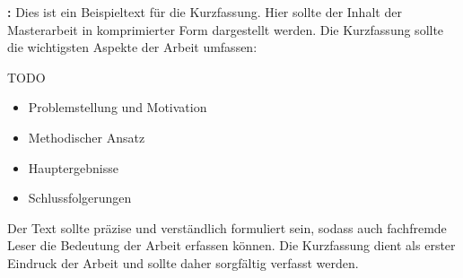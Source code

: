 

\textbf{\abstractLabel:} Dies ist ein Beispieltext für die Kurzfassung. Hier sollte der Inhalt der Masterarbeit in komprimierter
Form dargestellt werden. Die Kurzfassung sollte die wichtigsten Aspekte der Arbeit umfassen:

TODO

\begin{itemize}[leftmargin=0.63cm, label=\textbullet]
    \item Problemstellung und Motivation
    \item Methodischer Ansatz
    \item Hauptergebnisse
    \item Schlussfolgerungen
\end{itemize}

Der Text sollte präzise und verständlich formuliert sein, sodass auch fachfremde Leser die Bedeutung der
Arbeit erfassen können. Die Kurzfassung dient als erster Eindruck der Arbeit und sollte daher sorgfältig verfasst werden.



\clearpage
